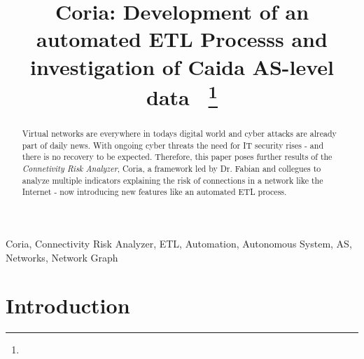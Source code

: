 \documentclass[conference, 11pt]{IEEEtran}
\begin{document}
			  
			  
\title{Coria: Development of an automated ETL Processs and investigation of Caida AS-level data\
{\footnotesize \textsuperscript{}}
\thanks{}
}

\author{
\and
{}
}

\maketitle
\thispagestyle{plain}
\pagestyle{plain}



\begin{abstract}

Virtual networks are everywhere in todays digital world and cyber attacks are already part of daily news. With ongoing cyber threats the need for IT security rises - and there is no recovery to be expected. Therefore, this paper poses further results of the \textit{Connetivity Risk Analyzer}, Coria, a framework led by Dr. Fabian and collegues to analyze multiple indicators explaining the risk of connections in a network like the Internet - now introducing new features like an automated ETL process.

\end{abstract}

\begin{IEEEkeywords}
Coria, Connectivity Risk Analyzer, ETL, Automation, Autonomous System, AS, Networks, Network Graph
\end{IEEEkeywords}


\section{Introduction}
\end{document}
